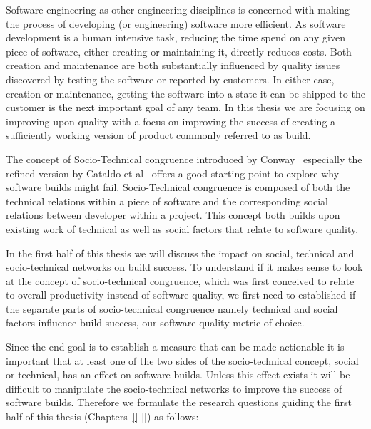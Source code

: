 Software engineering as other engineering disciplines is concerned with making the process of developing (or engineering) software more efficient.
As software development is a human intensive task, reducing the time spend on any given piece of software, either creating or maintaining it, directly reduces costs.
Both creation and maintenance are both substantially influenced by quality issues discovered by testing the software or reported by customers.
In either case, creation or maintenance, getting the software into a state it can be shipped to the customer is the next important goal of any team.
In this thesis we are focusing on improving upon quality with a focus on improving the success of creating a sufficiently working version of product commonly referred to as build.

The concept of Socio-Technical congruence introduced by Conway~\cite{} especially the refined version by Cataldo et al~\cite{} offers a good starting point to explore why software builds might fail.
Socio-Technical congruence is composed of both the technical relations within a piece of software and the corresponding social relations between developer within a project.
This concept both builds upon existing work of technical as well as social factors that relate to software quality.

In the first half of this thesis we will discuss the impact on social, technical and socio-technical networks on build success.
To understand if it makes sense to look at the concept of socio-technical congruence, which was first conceived to relate to overall productivity instead of software quality, we first need to established if the separate parts of socio-technical congruence namely technical and social factors influence build success, our software quality metric of choice.

Since the end goal is to establish a measure that can be made actionable it is important that at least one of the two sides of the socio-technical concept, social or technical, has an effect on software builds.
Unless this effect exists it will be difficult to manipulate the socio-technical networks to improve the success of software builds.
Therefore we formulate the research questions guiding the first half of this thesis (Chapters~\ref{}-\ref{}) as follows:

